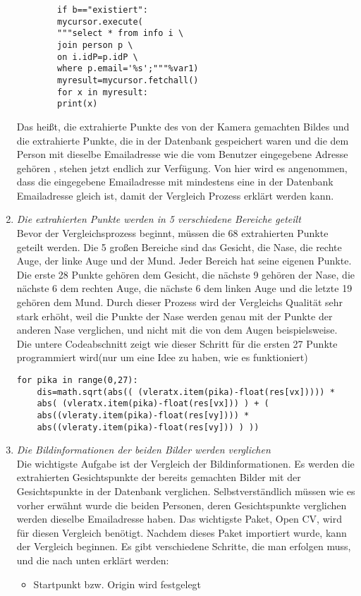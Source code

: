 \begin{enumerate}
	\begin{lstlisting}
		if b=="existiert":
		mycursor.execute(
		"""select * from info i \
		join person p \
		on i.idP=p.idP \
		where p.email='%s';"""%var1)
		myresult=mycursor.fetchall()
		for x in myresult:
		print(x)
	\end{lstlisting}
	
	Das heißt, die extrahierte Punkte des von der Kamera gemachten Bildes und die extrahierte Punkte, die in der Datenbank gespeichert waren und die dem Person mit dieselbe Emailadresse wie die vom Benutzer eingegebene Adresse gehören , stehen jetzt endlich zur Verfügung. Von hier wird es angenommen, dass die eingegebene Emailadresse mit mindestens eine in der Datenbank Emailadresse gleich ist, damit der Vergleich Prozess erklärt werden kann.
	\item \textit{Die extrahierten Punkte werden in 5 verschiedene Bereiche geteilt} \\
	
	Bevor der Vergleichsprozess beginnt, müssen die 68 extrahierten Punkte geteilt werden. Die 5 großen Bereiche sind das Gesicht, die Nase, die rechte Auge, der linke Auge und der Mund. Jeder Bereich hat seine eigenen Punkte. Die erste 28 Punkte gehören dem Gesicht, die nächste 9 gehören der Nase, die nächste 6 dem rechten Auge, die nächste 6 dem linken Auge und die letzte 19 gehören dem Mund. Durch dieser Prozess wird der Vergleichs Qualität sehr stark erhöht, weil die Punkte der Nase werden genau mit der Punkte der anderen Nase verglichen, und nicht mit die von dem Augen beispielsweise. \\
	Die untere Codeabschnitt zeigt wie dieser Schritt für die ersten 27 Punkte programmiert wird(nur um eine Idee zu haben, wie es funktioniert)\\
	
\begin{lstlisting}
for pika in range(0,27):
	dis=math.sqrt(abs(( (vleratx.item(pika)-float(res[vx])))) * 
	abs( (vleratx.item(pika)-float(res[vx])) ) + ( 
	abs((vleraty.item(pika)-float(res[vy]))) *
	abs((vleraty.item(pika)-float(res[vy])) ) ))
\end{lstlisting}
	\item \textit{Die Bildinformationen der beiden Bilder werden verglichen} \\
	
Die wichtigste Aufgabe ist der Vergleich der Bildinformationen. Es werden die extrahierten Gesichtspunkte der bereits gemachten Bilder mit der Gesichtspunkte in der Datenbank verglichen. Selbstverständlich müssen wie es vorher erwähnt wurde die beiden Personen, deren Gesichtspunkte verglichen werden dieselbe Emailadresse haben. Das wichtigste Paket, Open CV, wird für diesen Vergleich ben{\"o}tigt. Nachdem dieses Paket importiert wurde, kann der Vergleich beginnen. Es gibt verschiedene Schritte, die man erfolgen muss, und die nach unten erklärt werden:
\begin{itemize}
	\item Startpunkt bzw. Origin wird festgelegt \\
	

\end{itemize}
\end{enumerate}
